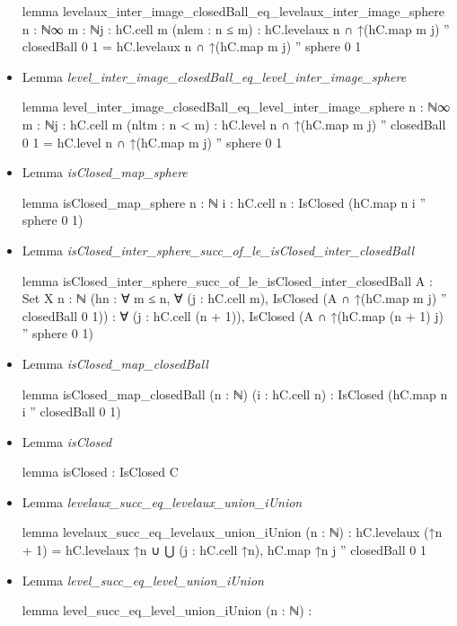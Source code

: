 \documentclass[colorinlistoftodos]{article}
\begin{document}
\begin{itemize}
\begin{leancode}
lemma levelaux_inter_image_closedBall_eq_levelaux_inter_image_sphere
{n : ℕ∞} {m : ℕ}{j : hC.cell m} (nlem : n ≤ m) :
  hC.levelaux n ∩ ↑(hC.map m j) '' closedBall 0 1 =
  hC.levelaux n ∩ ↑(hC.map m j) '' sphere 0 1
\end{leancode}
  \item Lemma \emph{level\_inter\_image\_closedBall\_eq\_level\_inter\_image\_sphere}
\begin{leancode}
lemma level_inter_image_closedBall_eq_level_inter_image_sphere
{n : ℕ∞} {m : ℕ}{j : hC.cell m} (nltm : n < m) :
  hC.level n ∩ ↑(hC.map m j) '' closedBall 0 1 =
  hC.level n ∩ ↑(hC.map m j) '' sphere 0 1
\end{leancode}
  \item Lemma \emph{isClosed\_map\_sphere}
\begin{leancode}
lemma isClosed_map_sphere {n : ℕ} {i : hC.cell n} : IsClosed (hC.map n i '' sphere 0 1)
\end{leancode}
  \item Lemma \emph{isClosed\_inter\_sphere\_succ\_of\_le\_isClosed\_inter\_closedBall}
\begin{leancode}
lemma isClosed_inter_sphere_succ_of_le_isClosed_inter_closedBall
{A : Set X} {n : ℕ}
(hn : ∀ m ≤ n, ∀ (j : hC.cell m), IsClosed (A ∩ ↑(hC.map m j) '' closedBall 0 1)) :
∀ (j : hC.cell (n + 1)), IsClosed (A ∩ ↑(hC.map (n + 1) j) '' sphere 0 1)
\end{leancode}
  \item Lemma \emph{isClosed\_map\_closedBall}
\begin{leancode}
lemma isClosed_map_closedBall (n : ℕ) (i : hC.cell n) :
  IsClosed (hC.map n i '' closedBall 0 1)
\end{leancode}
  \item Lemma \emph{isClosed}
\begin{leancode}
lemma isClosed : IsClosed C
\end{leancode}
  \item Lemma \emph{levelaux\_succ\_eq\_levelaux\_union\_iUnion}
\begin{leancode}
lemma levelaux_succ_eq_levelaux_union_iUnion (n : ℕ) :
  hC.levelaux (↑n + 1) = hC.levelaux ↑n ∪ ⋃ (j : hC.cell ↑n), hC.map ↑n j '' closedBall 0 1
\end{leancode}
  \item Lemma \emph{level\_succ\_eq\_level\_union\_iUnion}
\begin{leancode}
lemma level_succ_eq_level_union_iUnion (n : ℕ) :

\end{leancode}
\end{itemize}
\end{document}
